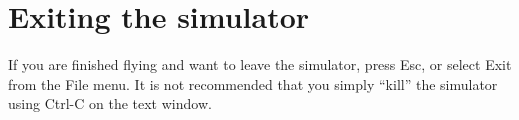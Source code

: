 \section{Exiting the simulator}

If you are finished flying and want to leave the simulator, press Esc, or select Exit from the File menu. It is not recommended that you simply ``kill'' the simulator using Ctrl-C on the text window.


